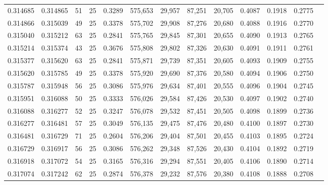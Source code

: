 \begin{tabular}{rrrrrrrrrrrrr}
0.314685 & 0.314865 &    51 &  25 &                                     0.3289 & 575,653 &  29,957 &  87,251 &  20,705 & 0.4087 & 0.1918 & 0.2775 \\
0.314866 & 0.315039 &    49 &  25 &                                     0.3378 & 575,702 &  29,908 &  87,276 &  20,680 & 0.4088 & 0.1916 & 0.2770 \\
0.315040 & 0.315212 &    63 &  25 &                                     0.2841 & 575,765 &  29,845 &  87,301 &  20,655 & 0.4090 & 0.1913 & 0.2765 \\
0.315214 & 0.315374 &    43 &  25 &                                     0.3676 & 575,808 &  29,802 &  87,326 &  20,630 & 0.4091 & 0.1911 & 0.2761 \\
0.315377 & 0.315620 &    63 &  25 &                                     0.2841 & 575,871 &  29,739 &  87,351 &  20,605 & 0.4093 & 0.1909 & 0.2755 \\
0.315620 & 0.315785 &    49 &  25 &                                     0.3378 & 575,920 &  29,690 &  87,376 &  20,580 & 0.4094 & 0.1906 & 0.2750 \\
0.315787 & 0.315948 &    56 &  25 &                                     0.3086 & 575,976 &  29,634 &  87,401 &  20,555 & 0.4096 & 0.1904 & 0.2745 \\
0.315951 & 0.316088 &    50 &  25 &                                     0.3333 & 576,026 &  29,584 &  87,426 &  20,530 & 0.4097 & 0.1902 & 0.2740 \\
0.316088 & 0.316277 &    52 &  25 &                                     0.3247 & 576,078 &  29,532 &  87,451 &  20,505 & 0.4098 & 0.1899 & 0.2736 \\
0.316277 & 0.316481 &    57 &  25 &                                     0.3049 & 576,135 &  29,475 &  87,476 &  20,480 & 0.4100 & 0.1897 & 0.2730 \\
0.316481 & 0.316729 &    71 &  25 &                                     0.2604 & 576,206 &  29,404 &  87,501 &  20,455 & 0.4103 & 0.1895 & 0.2724 \\
0.316729 & 0.316917 &    56 &  25 &                                     0.3086 & 576,262 &  29,348 &  87,526 &  20,430 & 0.4104 & 0.1892 & 0.2719 \\
0.316918 & 0.317072 &    54 &  25 &                                     0.3165 & 576,316 &  29,294 &  87,551 &  20,405 & 0.4106 & 0.1890 & 0.2714 \\
0.317074 & 0.317242 &    62 &  25 &                                     0.2874 & 576,378 &  29,232 &  87,576 &  20,380 & 0.4108 & 0.1888 & 0.2708 \\

\end{tabular}

